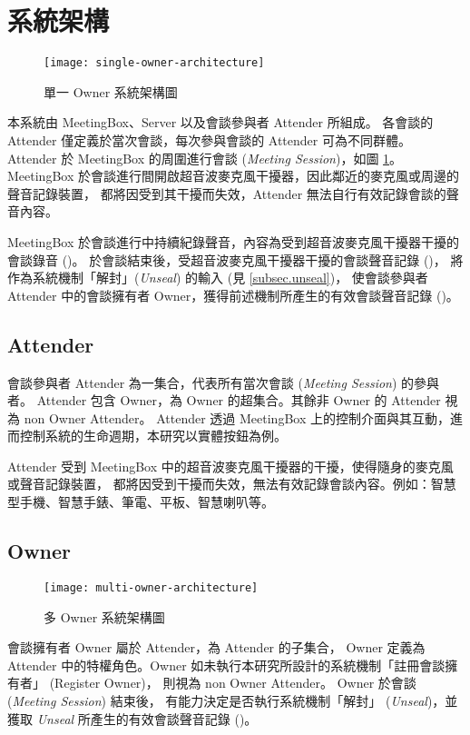 \section{系統架構}

\begin{figure}[H]
    \centering
    \texttt{[image: single-owner-architecture]}
    \caption{單一 Owner 系統架構圖}
    \label{fig.s-o-arch}
\end{figure}

    本系統由 MeetingBox、Server 以及會談參與者 Attender 所組成。
各會談的 Attender 僅定義於當次會談，每次參與會談的 Attender 可為不同群體。
Attender 於 MeetingBox 的周圍進行會談 ({\it Meeting Session})，如圖 \ref{fig.s-o-arch}。
MeetingBox 於會談進行間開啟超音波麥克風干擾器，因此鄰近的麥克風或周邊的聲音記錄裝置，
都將因受到其干擾而失效，Attender 無法自行有效記錄會談的聲音內容。

    MeetingBox 於會談進行中持續紀錄聲音，內容為受到超音波麥克風干擾器干擾的會談錄音 (\DEFrecJ)。
於會談結束後，受超音波麥克風干擾器干擾的會談聲音記錄 (\DEFrecJ)，
將作為系統機制「解封」({\it Unseal}) 的輸入 (見 \ref{subsec.unseal})，
使會談參與者 Attender 中的會談擁有者 Owner，獲得前述機制所產生的有效會談聲音記錄 (\DEFrecREV)。


\subsection{Attender}

    會談參與者 Attender 為一集合，代表所有當次會談 ({\it Meeting Session}) 的參與者。
Attender 包含 Owner，為 Owner 的超集合。其餘非 Owner 的 Attender 視為 non Owner Attender。
Attender 透過 MeetingBox 上的控制介面與其互動，進而控制系統的生命週期，本研究以實體按鈕為例。

    Attender 受到 MeetingBox 中的超音波麥克風干擾器的干擾，使得隨身的麥克風或聲音記錄裝置，
都將因受到干擾而失效，無法有效記錄會談內容。例如：智慧型手機、智慧手錶、筆電、平板、智慧喇叭等。


\subsection{Owner}

\begin{figure}[H]
    \centering
    \texttt{[image: multi-owner-architecture]}
    \caption{多 Owner 系統架構圖}
    \label{fig.m-o-arch}
\end{figure}

    會談擁有者 Owner 屬於 Attender，為 Attender 的子集合，
Owner 定義為 Attender 中的特權角色。Owner 如未執行本研究所設計的系統機制「註冊會談擁有者」 (Register Owner)，
則視為 non Owner Attender。 Owner 於會談 ({\it Meeting Session}) 結束後，
有能力決定是否執行系統機制「解封」 ({\it Unseal})，並獲取 {\it Unseal} 所產生的有效會談聲音記錄 (\DEFrecREV)。

